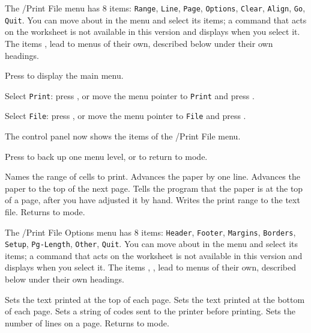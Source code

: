 The /Print File menu has 8 items: \texttt{Range}, \texttt{Line}, \texttt{Page}, \texttt{Options}, \texttt{Clear}, \texttt{Align}, \texttt{Go}, \texttt{Quit}.  You can move about in the menu and select its items; a command that acts on the worksheet is not available in this version and displays  when you select it.
The items ,  lead to menus of their own, described below under their own headings.
\begin{Steps123}
\item Press  to display the main menu.
\item Select \texttt{Print}: press , or move the menu pointer to \texttt{Print} and press .
\item Select \texttt{File}: press , or move the menu pointer to \texttt{File} and press .
\item The control panel now shows the items of the /Print File menu.
\item Press  to back up one menu level, or  to return to  mode.
\end{Steps123}
\begin{Options}
 Names the range of cells to print.
 Advances the paper by one line.
 Advances the paper to the top of the next page.
 Tells the program that the paper is at the top of a page, after you have adjusted it by hand.
 Writes the print range to the text file.
 Returns to  mode.
\end{Options}

The /Print File Options menu has 8 items: \texttt{Header}, \texttt{Footer}, \texttt{Margins}, \texttt{Borders}, \texttt{Setup}, \texttt{Pg-Length}, \texttt{Other}, \texttt{Quit}.  You can move about in the menu and select its items; a command that acts on the worksheet is not available in this version and displays  when you select it.
The items , ,  lead to menus of their own, described below under their own headings.
\begin{Options}
 Sets the text printed at the top of each page.
 Sets the text printed at the bottom of each page.
 Sets a string of codes sent to the printer before printing.
 Sets the number of lines on a page.
 Returns to  mode.
\end{Options}

